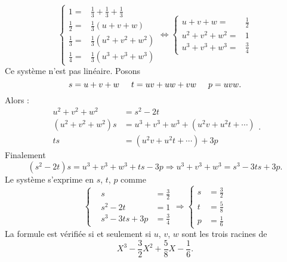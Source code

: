 \begin{enumerate}
\begin{displaymath}
 \left\lbrace 
\begin{aligned}
1 =& \frac{1}{3}+\frac{1}{3}+\frac{1}{3}\\
\frac{1}{2} =& \frac{1}{3}(u+v+w)\\
\frac{1}{3} =& \frac{1}{3}(u^{2}+v^{2}+w^{2})\\
\frac{1}{4} =& \frac{1}{3}(u^{3}+v^{3}+w^{3})
\end{aligned}
\right. 
\Leftrightarrow
\left\lbrace 
\begin{aligned}
u+v+w =& \frac{1}{2}\\
u^{2}+v^{2}+w^{2} =& 1\\
u^{3}+v^{3}+w^{3} =& \frac{3}{4}
\end{aligned}
\right. 
\end{displaymath}
Ce système n'est pas linéaire. Posons
\[
 s=u+v+w \hspace{0.5cm} t=uv+uw+vw \hspace{0.5cm} p=uvw.
\]
Alors :
\[
\begin{aligned}
u^{2} + v^{2} + w^{2}    &= s^{2} - 2t\\
(u^{2} + v^{2} + w^{2})s &= u^{3} + v^{3} + w^{3} + (u^{2}v + u^{2}t + \cdots) \\
ts &= (u^{2}v + u^{2}t + \cdots ) + 3p
\end{aligned}.
\]
Finalement
\[
(s^{2} - 2t)s = u^{3} + v^{3} + w^{3} + ts - 3p \Rightarrow u^{3} + v^{3} + w^{3} = s^{3} - 3ts + 3p.
\]
Le système s'exprime en $s$, $t$, $p$ comme
\begin{displaymath}
 \left\lbrace 
\begin{aligned}
 &s                &= \frac{3}{2}\\
 &s^{2} - 2t       &= 1\\
 &s^{3} - 3ts + 3p &= \frac{3}{4}
\end{aligned}
\right. 
\Rightarrow 
\left\lbrace 
\begin{aligned}
s &= \frac{3}{2}\\
t &= \frac{5}{8}\\ 
p &= \frac{1}{6} 
\end{aligned}
\right. 
\end{displaymath}
La formule est vérifiée si et seulement si $u$, $v$, $w$ sont les trois racines de
\[ 
X^{3}-\frac{3}{2}X^{2}+\frac{5}{8}X-\frac{1}{6}. 
\]
\end{enumerate}
